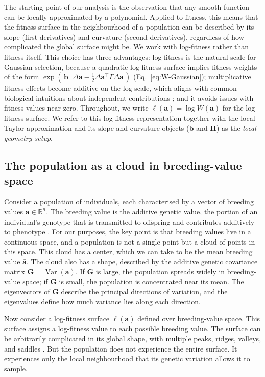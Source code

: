 \documentclass[9pt,twocolumn,twoside,lineno]{gsajnl}
\newcommand{\vect}[1]{\boldsymbol{#1}}
\newcommand{\mat}[1]{\mathbf{#1}}
\newcommand{\RR}{\ensuremath{\mathbb{R}}\xspace}
\newcommand{\Var}{\ensuremath{\operatorname{Var}}\xspace}
\begin{document}
The starting point of our analysis is the observation that any smooth function can be locally approximated by a polynomial. Applied to fitness, this means that the fitness surface in the neighbourhood of a population can be described by its slope (first derivatives) and curvature (second derivatives), regardless of how complicated the global surface might be. We work with log-fitness rather than fitness itself. This choice has three advantages: log-fitness is the natural scale for Gaussian selection, because a quadratic log-fitness surface implies fitness weights of the form $\exp(\,\vect{b}^\top\Delta\vect{a}-\tfrac{1}{2}\Delta\vect{a}^\top\Gamma\Delta\vect{a}\,)$ (Eq.~\eqref{eq:W-Gaussian}); multiplicative fitness effects become additive on the log scale, which aligns with common biological intuitions about independent contributions \citep{Rice2004}; and it avoids issues with fitness values near zero. Throughout, we write $\ell(\vect{a}) = \log W(\vect{a})$ for the log-fitness surface. We refer to this log-fitness representation together with the local Taylor approximation and its slope and curvature objects ($\vect{b}$ and $\mat{H}$) as the \emph{local-geometry setup}.

\subsection{The population as a cloud in breeding-value space}

Consider a population of individuals, each characterised by a vector of breeding values $\vect{a} \in \RR^n$. The breeding value is the additive genetic value, the portion of an individual's genotype that is transmitted to offspring and contributes additively to phenotype \citep{Fisher1918, Lynch1998}. For our purposes, the key point is that breeding values live in a continuous space, and a population is not a single point but a cloud of points in this space. This cloud has a center, which we can take to be the mean breeding value $\bar{\vect{a}}$. The cloud also has a shape, described by the additive genetic covariance matrix $\mat{G} = \Var(\vect{a})$. If $\mat{G}$ is large, the population spreads widely in breeding-value space; if $\mat{G}$ is small, the population is concentrated near its mean. The eigenvectors of $\mat{G}$ describe the principal directions of variation, and the eigenvalues define how much variance lies along each direction.

Now consider a log-fitness surface $\ell(\vect{a})$ defined over breeding-value space. This surface assigns a log-fitness value to each possible breeding value. The surface can be arbitrarily complicated in its global shape, with multiple peaks, ridges, valleys, and saddles \citep{Gavrilets2004}. But the population does not experience the entire surface. It experiences only the local neighbourhood that its genetic variation allows it to sample.
\end{document}
